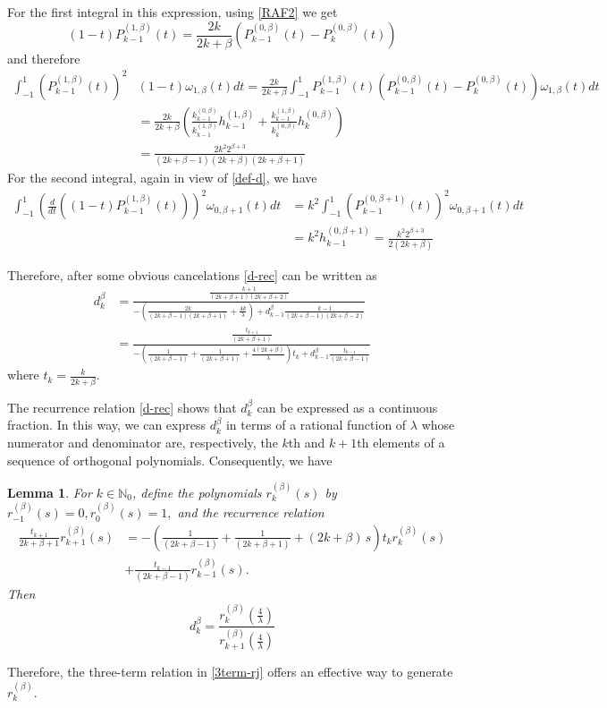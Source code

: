 \documentclass{amsart}
\theoremstyle{plain}%
\newtheorem{lem}[thm]{Lemma}
\theoremstyle{definition}
\theoremstyle{remark}
\begin{document}
For the first integral in this expression, using \eqref{RAF2} we get
\[
(1-t)P_{k-1}^{(1, \beta)}(t) = \frac{2k}{2k+\beta}\left(P_{k-1}^{(0, \beta)}(t)- P_{k}^{(0, \beta)}(t)\right)
\]
and therefore
\begin{align*}
\int_{-1}^1 \left(P_{k-1}^{(1, \beta)}(t)\right)^2& (1-t) \omega_{1,\beta}(t) dt = \frac{2k}{2k+\beta}\int_{-1}^1 P_{k-1}^{(1, \beta)}(t) \left(P_{k-1}^{(0, \beta)}(t)- P_{k}^{(0, \beta)}(t)\right) \omega_{1,\beta}(t) dt\\
&= \frac{2k}{2k+\beta}\left(\frac{k_{k-1}^{(0,\beta)}}{k_{k-1}^{(1,\beta)}} h_{k-1}^{(1,\beta)} +
\frac{k_{k-1}^{(1,\beta)}}{k_{k}^{(0,\beta)}} h_{k}^{(0,\beta)}\right) \\
& = \frac{2 k^2 2^{\beta+3} }{(2k+\beta-1)(2k+\beta)(2k+\beta+1)}
\end{align*}
For the second integral, again in view of \eqref{def-d}, we have
\begin{align*}
\int_{-1}^1 \left(\frac{d}{dt}\left((1-t)P_{k-1}^{(1, \beta)}(t)\right)\right)^2  \omega_{0,\beta+1}(t) dt &= k^2  
\int_{-1}^1 \left(P_{k-1}^{(0, \beta+1)}(t)\right)^2  \omega_{0,\beta+1}(t) dt \\
&= k^2 h_{k-1}^{(0, \beta+1)} = 
\frac{k^2 2^{\beta+3} }{2(2k+\beta)}
\end{align*}


Therefore, after some obvious cancelations \eqref{d-rec} can be written as
\begin{align*}
d_{k}^{\beta} &= \frac{\frac{ k+1 }{(2k+\beta+1)(2k+\beta+2)}}{-\left(\frac{ 2k }{(2k+\beta-1)(2k+\beta+1)} + \frac{4k}{\lambda}\right) + d_{k-1}^{\beta}\frac{ k-1 }{(2k+\beta-1)(2k+\beta-2)}}\\
&= \frac{\frac{ t_{k+1} }{(2k+\beta+1)}}{-\left(\frac{ 1 }{(2k+\beta-1)} + \frac{ 1 }{(2k+\beta+1)} + \frac{4(2k+\beta)}{\lambda}\right)t_k + d_{k-1}^{\beta}\frac{ t_{k-1} }{(2k+\beta-1)}}
\end{align*}
where \(t_k = \frac{k}{2k+\beta}\).

The recurrence relation \eqref{d-rec} shows that $d_k^{\beta}$ can be expressed as a continuous fraction. In this way, we can express $d_k^{\beta}$ in terms of a rational function of $\lambda$ whose numerator and denominator are, respectively, the $k$th and $k+1$th elements of a sequence of orthogonal polynomials. Consequently, we have
\begin{lem} 
For $k \in \mathbb{N}_0$, define the polynomials $r_k^{(\beta)}(s)$ by $r_{-1}^{(\beta)}(s) = 0, r_0^{(\beta)}(s) =1,$ and the recurrence relation
\begin{align} \label{3term-rj}
 \frac{t_{k+1}}{2k+\beta+1} r_{k+1}^{(\beta)}(s) &= -\left(\frac{ 1 }{(2k+\beta-1)} + \frac{ 1 }{(2k+\beta+1)} + (2k+\beta)\,s\right)t_k  r_{k}^{(\beta)}(s) \nonumber \\
 &+   \frac{ t_{k-1} }{(2k+\beta-1)}r_{k-1}^{(\beta)}(s). 
\end{align}
Then 
\[
d_{k}^{\beta} = \frac{r_{k}^{(\beta)}(\frac{4}{\lambda})}{r_{k+1}^{(\beta)}(\frac{4}{\lambda})}\]
\end{lem}
Therefore, the three-term relation in \eqref{3term-rj} offers an effective way to generate $r_{k}^{(\beta)}$. 
\end{document}
